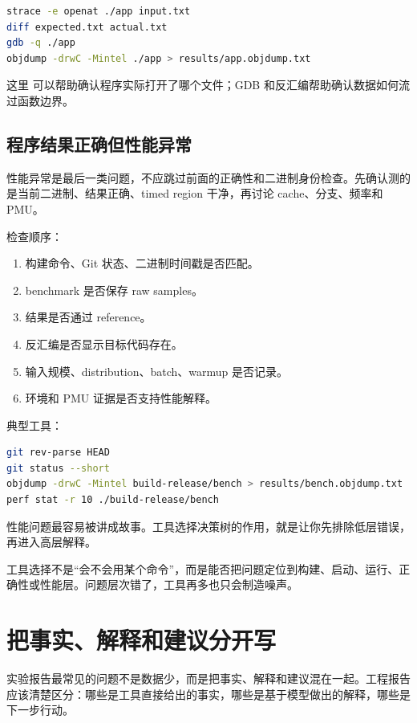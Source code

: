 \begin{lstlisting}[language=bash]
strace -e openat ./app input.txt
diff expected.txt actual.txt
gdb -q ./app
objdump -drwC -Mintel ./app > results/app.objdump.txt
\end{lstlisting}

这里  可以帮助确认程序实际打开了哪个文件；GDB 和反汇编帮助确认数据如何流过函数边界。

\subsection{程序结果正确但性能异常}

性能异常是最后一类问题，不应跳过前面的正确性和二进制身份检查。先确认测的是当前二进制、结果正确、timed region 干净，再讨论 cache、分支、频率和 PMU。

检查顺序：

\begin{enumerate}
  \item 构建命令、Git 状态、二进制时间戳是否匹配。
  \item benchmark 是否保存 raw samples。
  \item 结果是否通过 reference。
  \item 反汇编是否显示目标代码存在。
  \item 输入规模、distribution、batch、warmup 是否记录。
  \item 环境和 PMU 证据是否支持性能解释。
\end{enumerate}

典型工具：

\begin{lstlisting}[language=bash]
git rev-parse HEAD
git status --short
objdump -drwC -Mintel build-release/bench > results/bench.objdump.txt
perf stat -r 10 ./build-release/bench
\end{lstlisting}

性能问题最容易被讲成故事。工具选择决策树的作用，就是让你先排除低层错误，再进入高层解释。

\begin{keyidea}
工具选择不是“会不会用某个命令”，而是能否把问题定位到构建、启动、运行、正确性或性能层。问题层次错了，工具再多也只会制造噪声。
\end{keyidea}

\section{把事实、解释和建议分开写}

实验报告最常见的问题不是数据少，而是把事实、解释和建议混在一起。工程报告应该清楚区分：哪些是工具直接给出的事实，哪些是基于模型做出的解释，哪些是下一步行动。

